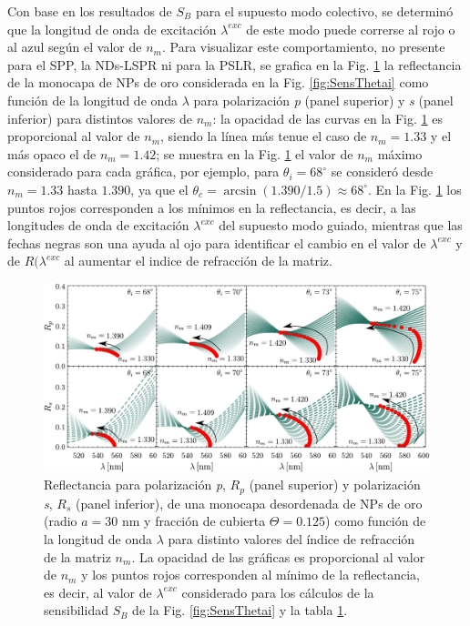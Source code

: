 Con base en los resultados de $S_B$ para el supuesto modo colectivo, se determinó que la longitud de onda de excitación $\lambda^{exc}$ de este modo puede correrse al rojo o al azul según el valor de $n_m$. Para visualizar este comportamiento, no presente para el SPP, la NDs-LSPR ni para la PSLR, se grafica en la Fig. \ref{fig:SensRpRs} la reflectancia de la monocapa de NPs de oro considerada en la Fig. \ref{fig:SensThetai} como función de la longitud de onda $\lambda$ para polarización \emph{p} (panel superior) y \emph{s} (panel inferior) para distintos valores de $n_m$: la opacidad de las curvas en la Fig. \ref{fig:SensRpRs} es proporcional al valor de $n_m$, siendo la línea más tenue el caso de $n_m=1.33$ y el más opaco el de $n_m=1.42$; se muestra en la Fig. \ref{fig:SensRpRs} el valor de $n_m$ máximo considerado para cada gráfica, por ejemplo, para $\theta_i=68^\circ$ se consideró desde $n_m=1.33$ hasta $1.390$, ya que el $\theta_c=\arcsin(1.390/1.5)\approx 68^\circ$. En la Fig. \ref{fig:SensRpRs} los puntos rojos corresponden a los mínimos en la reflectancia, es decir, a las longitudes de onda de excitación $\lambda^{exc}$ del supuesto modo guiado, mientras que las fechas negras son una ayuda al ojo para identificar el cambio en el valor de $\lambda^{exc}$ y de $R(\lambda^{exc}$ al aumentar el indice de refracción de la matriz.

\begin{figure}[h!]\centering
	\includegraphics[width=1\linewidth]{2-Resultados/figs/11-SPPCSM/2-RpRs}\vspace*{-.7em}%
\caption{Reflectancia para polarización \emph{p}, $R_p$ (panel superior) y polarización \emph{s}, $R_s$ (panel inferior), de una monocapa desordenada de NPs de oro (radio $a=30$ nm y fracción de cubierta $\Theta=0.125$)  como función de la longitud de onda $\lambda$ para distinto valores del  índice de refracción de la matriz $n_m$. La opacidad de las gráficas es proporcional al valor de $n_m$  y los puntos rojos corresponden al mínimo de la reflectancia, es decir, al valor de $\lambda^{exc}$ considerado para los cálculos de la sensibilidad $S_B$ de la Fig. \ref{fig:SensThetai} y la tabla \ref{fig:SensRpRs}.	
	}\label{fig:SensRpRs}
	\end{figure}	

